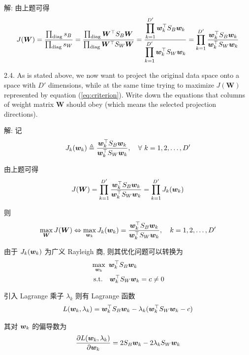 \documentclass{article}
\begin{document}
解: 由上题可得
\begin{equation}
    J(\bm{W})
    =\frac{\prod_{\operatorname{diag}}s_{B}}{\prod_{\operatorname{diag}}s_{W}}
    =\frac{\prod_{\operatorname{diag}}\bm{W}^{\top}S_B\bm{W}}{\prod_{\operatorname{diag}}\bm{W}^{\top}S_W\bm{W}}
    =\frac{\displaystyle\prod_{k=1}^{D'}\bm{w}_k^{\top}S_B\bm{w}_k}{\displaystyle\prod_{k=1}^{D'}\bm{w}_k^{\top}S_W\bm{w}_k}
    =\prod_{k=1}^{D'}\frac{\bm{w}_k^{\top}S_B\bm{w}_k}{\bm{w}_k^{\top}S_W\bm{w}_k}
\end{equation}

2.4. As is stated above, we now want to project the original data space onto a space with $D'$ dimensions, while at the same time trying to maximize $J(\bm{W})$ represented by equation (\ref{eq:criterion}). Write down the equations that columns of weight matrix $\bm{W}$ should obey (which means the selected projection directions).

解: 记
\begin{equation}
  J_k(\bm{w}_k)\triangleq\frac{\bm{w}_k^{\top}S_B\bm{w}_k}{\bm{w}_k^{\top}S_W\bm{w}_k},\quad\forall~k=1,2,\dots,D'
\end{equation}

由上题可得
\begin{equation}
  J(\bm{W})=\prod_{k=1}^{D'}\frac{\bm{w}_k^{\top}S_B\bm{w}_k}{\bm{w}_k^{\top}S_W\bm{w}_k}=\prod_{k=1}^{D'}J_k(\bm{w}_k)
\end{equation}

则
\begin{equation}
  \max_{\bm{W}} J(\bm{W})\Leftrightarrow\max_{\bm{w}_k}J_k(\bm{w}_k)=\frac{\bm{w}_k^{\top}S_B\bm{w}_k}{\bm{w}_k^{\top}S_W\bm{w}_k},\quad k=1,2,\dots,D'
\end{equation}

由于 $J_k(\bm{w}_k)$ 为广义 Rayleigh 商, 则其优化问题可以转换为
\begin{equation}
  \begin{aligned}
    &\max_{\bm{w}_k}~\bm{w}_k^{\top}S_B\bm{w}_k\\
    &~\mathrm{s.t.}~~~\bm{w}_k^{\top}S_W\bm{w}_k=c\neq0\\
  \end{aligned}
\end{equation}

引入 Lagrange 乘子 $\lambda_k$ 则有 Lagrange 函数
\begin{equation}
  L(\bm{w}_k,\lambda_k)=\bm{w}_k^{\top}S_B\bm{w}_k-\lambda_k(\bm{w}_k^{\top}S_W\bm{w}_k-c)
\end{equation}

其对 $\bm{w}_k$ 的偏导数为
\begin{equation}
  \frac{\partial L(\bm{w}_k,\lambda_k)}{\partial\bm{w}_k}=2S_B\bm{w}_k-2\lambda_kS_W\bm{w}_k
\end{equation}
\end{document}
